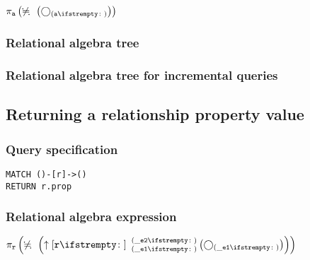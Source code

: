 $\projection{\var{a}} \left(\alldifferent{} \left(\getvertices{a}{}\right)\right)$

\subsubsection*{Relational algebra tree}


\subsubsection*{Relational algebra tree for incremental queries}


\subsection{Returning a relationship property value}

\subsubsection*{Query specification}

\begin{lstlisting}
MATCH ()-[r]->()
RETURN r.prop
\end{lstlisting}

\subsubsection*{Relational algebra expression}

$\projection{\var{r}} \left(\alldifferent{} \left(\expandout{r}{}{\_e1}{\_e2}{} \left(\getvertices{\_e1}{}\right)\right)\right)$

